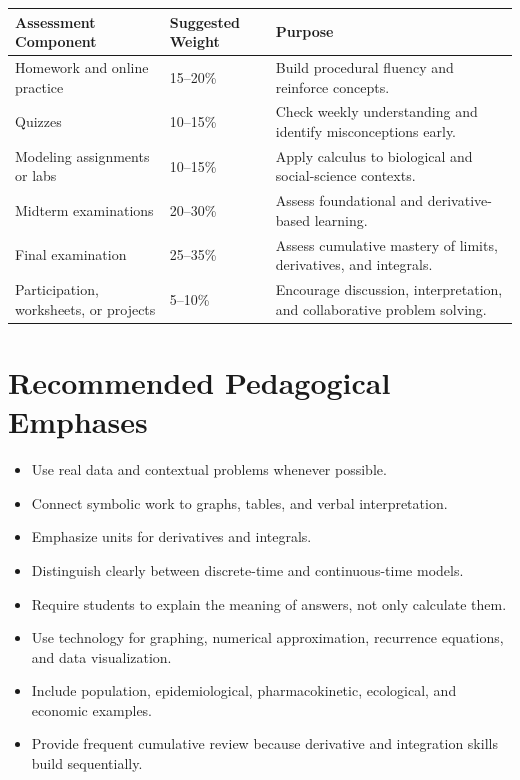 \documentclass[11pt]{article}
\begin{document}
\begin{table}[h!]
\centering
\begin{tabular}{p{} p{} p{}}
\toprule
\textbf{Assessment Component} & \textbf{Suggested Weight} & \textbf{Purpose} \\
\midrule
Homework and online practice & 15--20\% & Build procedural fluency and reinforce concepts. \\
Quizzes & 10--15\% & Check weekly understanding and identify misconceptions early. \\
Modeling assignments or labs & 10--15\% & Apply calculus to biological and social-science contexts. \\
Midterm examinations & 20--30\% & Assess foundational and derivative-based learning. \\
Final examination & 25--35\% & Assess cumulative mastery of limits, derivatives, and integrals. \\
Participation, worksheets, or projects & 5--10\% & Encourage discussion, interpretation, and collaborative problem solving. \\
\bottomrule
\end{tabular}
\end{table}

\section{Recommended Pedagogical Emphases}

\begin{itemize}
    \item Use real data and contextual problems whenever possible.
    \item Connect symbolic work to graphs, tables, and verbal interpretation.
    \item Emphasize units for derivatives and integrals.
    \item Distinguish clearly between discrete-time and continuous-time models.
    \item Require students to explain the meaning of answers, not only calculate them.
    \item Use technology for graphing, numerical approximation, recurrence equations, and data visualization.
    \item Include population, epidemiological, pharmacokinetic, ecological, and economic examples.
    \item Provide frequent cumulative review because derivative and integration skills build sequentially.
\end{itemize}
\end{document}
